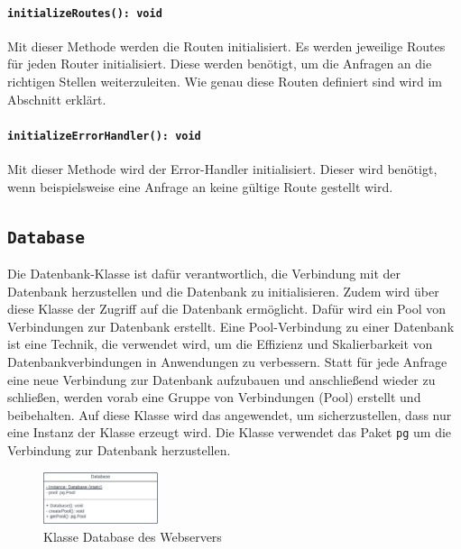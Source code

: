 \documentclass{entwurfsheft}
\begin{document}
\begin{sloppypar}
\paragraph{\texttt{initializeRoutes(): void}}
Mit dieser Methode werden die Routen initialisiert.
Es werden jeweilige Routes für jeden Router initialisiert. Diese werden benötigt, um die Anfragen an die richtigen Stellen weiterzuleiten.
Wie genau diese Routen definiert sind wird im Abschnitt  erklärt.
\paragraph{\texttt{initializeErrorHandler(): void}}
Mit dieser Methode wird der Error-Handler initialisiert. Dieser wird benötigt, wenn beispielsweise eine Anfrage an keine gültige Route gestellt wird.

\newpage

\subsection{\texttt{Database}}\label{sec:Database}
Die Datenbank-Klasse ist dafür verantwortlich, die Verbindung mit der Datenbank herzustellen und die Datenbank zu initialisieren.
Zudem wird über diese Klasse der Zugriff auf die Datenbank ermöglicht.
Dafür wird ein Pool von Verbindungen zur Datenbank erstellt.
Eine Pool-Verbindung zu einer Datenbank ist eine Technik, die verwendet wird, um die Effizienz und Skalierbarkeit von Datenbankverbindungen in Anwendungen zu verbessern.
Statt für jede Anfrage eine neue Verbindung zur Datenbank aufzubauen und anschließend wieder zu schließen, werden vorab eine Gruppe von Verbindungen (Pool) erstellt und beibehalten.
Auf diese Klasse wird das  angewendet, um sicherzustellen, dass nur eine Instanz der Klasse erzeugt wird.
Die Klasse verwendet das Paket \texttt{pg} um die Verbindung zur Datenbank herzustellen.

\begin{figure}[htp]
    \centering
    \includegraphics[width = 0.3\textwidth]{images/webserver/database.pdf}
    \caption{Klasse Database des Webservers}
    \label{fig:database}
\end{figure}


\end{sloppypar}
\end{document}
